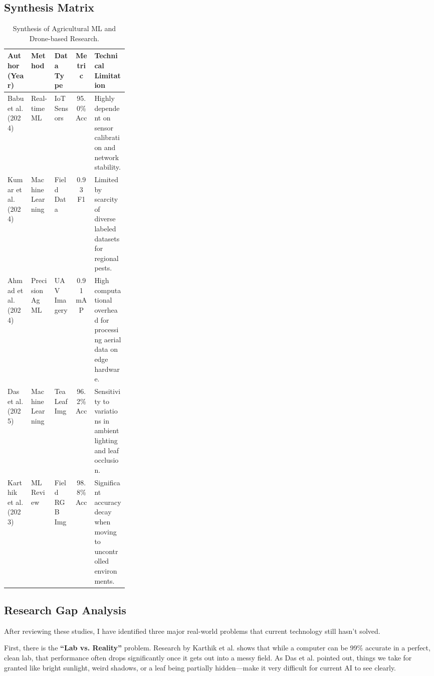 \documentclass[12pt,a4paper]{article}
\begin{document}
\subsection{Synthesis Matrix}
\begin{table}[h!]
\centering
\footnotesize
\renewcommand{\arraystretch}{1.5}
\setlength{\tabcolsep}{2.5pt} 
\begin{tabular}{|l|l|l|c|p{0.28\linewidth}|} 
\hline
\textbf{Author (Year)} & \textbf{Method} & \textbf{Data Type} & \textbf{Metric} & \textbf{Technical Limitation} \\ \hline \hline

Babu et al. (2024) \cite{babu2024} & Real-time ML & IoT Sensors & 95.0\% Acc & Highly dependent on sensor calibration and network stability. \\ \hline

Kumar et al. (2024) \cite{eai2024} & Machine Learning & Field Data & 0.93 F1 & Limited by scarcity of diverse labeled datasets for regional pests. \\ \hline

Ahmad et al. (2024) \cite{uav_ml2024} & Precision Ag ML & UAV Imagery & 0.91 mAP & High computational overhead for processing aerial data on edge hardware. \\ \hline

Das et al. (2025) \cite{tea_precision2025} & Machine Learning & Tea Leaf Img & 96.2\% Acc & Sensitivity to variations in ambient lighting and leaf occlusion. \\ \hline

Karthik et al. (2023) \cite{karthik2023} & ML Review & Field RGB Img & 98.8\% Acc & Significant accuracy decay when moving to uncontrolled environments. \\ \hline
\end{tabular}
\caption{Synthesis of Agricultural ML and Drone-based Research.}
\end{table}


\subsection{Research Gap Analysis} 
After reviewing these studies, I have identified three major real-world problems that current technology still hasn't solved.

First, there is the \textbf{``Lab vs. Reality''} problem. Research by Karthik et al. \cite{karthik2023} shows that while a computer can be 99\% accurate in a perfect, clean lab, that performance often drops significantly once it gets out into a messy field. As Das et al. \cite{tea_precision2025} pointed out, things we take for granted like bright sunlight, weird shadows, or a leaf being partially hidden—make it very difficult for current AI to see clearly.
\end{document}
